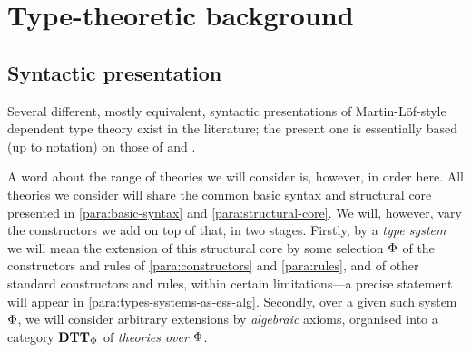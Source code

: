 

\section{Type-theoretic background}


\subsection{Syntactic presentation}

\begin{para}Several different, mostly equivalent, syntactic presentations of Martin-Löf-style dependent type theory exist in the literature; the present one is essentially based (up to notation) on those of \cite{pitts:categorial-logic} and \cite{hofmann:syntax-and-semantics}.

A word about the range of theories we will consider is, however, in order here.  All theories we consider will share the common basic syntax and structural core presented in \ref{para:basic-syntax} and \ref{para:structural-core}.  We will, however, vary the constructors we add on top of that, in two stages.  Firstly, by a \emph{type system} we will mean the extension of this structural core by some selection ${\Phi}$ of the constructors and rules of \ref{para:constructors} and \ref{para:rules}, and of other standard constructors and rules, within certain limitations---a precise statement will appear in \ref{para:types-systems-as-ess-alg}.  Secondly, over a given such system ${\Phi}$, we will consider arbitrary extensions by \emph{algebraic} axioms, organised into a category $\mathbf{DTT}_{\Phi}$ of \emph{theories over ${\Phi}$}.
\end{para}

